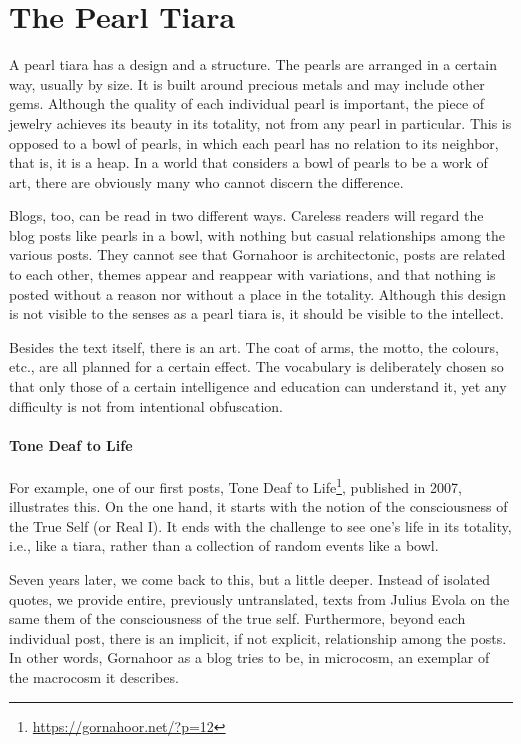 \section{The Pearl Tiara}

A pearl tiara has a design and a structure. The pearls are arranged in a certain way, usually by size. It is built around precious metals and may include other gems. Although the quality of each individual pearl is important, the piece of jewelry achieves its beauty in its totality, not from any pearl in particular. This is opposed to a bowl of pearls, in which each pearl has no relation to its neighbor, that is, it is a heap. In a world that considers a bowl of pearls to be a work of art, there are obviously many who cannot discern the difference.

Blogs, too, can be read in two different ways. Careless readers will regard the blog posts like pearls in a bowl, with nothing but casual relationships among the various posts. They cannot see that Gornahoor is architectonic, posts are related to each other, themes appear and reappear with variations, and that nothing is posted without a reason nor without a place in the totality. Although this design is not visible to the senses as a pearl tiara is, it should be visible to the intellect.

Besides the text itself, there is an art. The coat of arms, the motto, the colours, etc., are all planned for a certain effect. The vocabulary is deliberately chosen so that only those of a certain intelligence and education can understand it, yet any difficulty is not from intentional obfuscation.

\paragraph{Tone Deaf to Life}


For example, one of our first posts, Tone Deaf to Life\footnote{\url{https://gornahoor.net/?p=12}}, published in 2007, illustrates this. On the one hand, it starts with the notion of the consciousness of the True Self (or Real I). It ends with the challenge to see one's life in its totality, i.e., like a tiara, rather than a collection of random events like a bowl.

Seven years later, we come back to this, but a little deeper. Instead of isolated quotes, we provide entire, previously untranslated, texts from Julius Evola on the same them of the consciousness of the true self. Furthermore, beyond each individual post, there is an implicit, if not explicit, relationship among the posts. In other words, Gornahoor as a blog tries to be, in microcosm, an exemplar of the macrocosm it describes.

